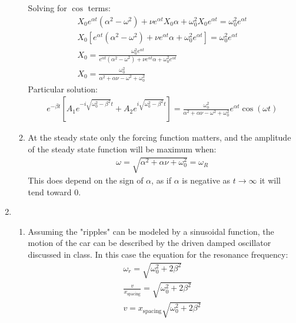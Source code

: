 \documentclass[12pt]{article}
\begin{document}
\begin{enumerate}
\begin{enumerate}
            Solving for $\cos$ terms:
            \begin{gather*}
                X_0 e^{\alpha t}\left(\alpha^2-\omega^2\right)+\nu e^{\alpha t}X_0\alpha+\omega_0^2 X_0 e^{\alpha t}=\omega_0^2 e^{\alpha t}\\
                X_0\left[e^{\alpha t}\left(\alpha^2-\omega^2\right)+\nu e^{\alpha t}\alpha+\omega_0^2 e^{\alpha t}\right]=\omega_0^2 e^{\alpha t}\\
                X_0=\frac{\omega_0^2 e^{\alpha t}}{e^{\alpha t}\left(\alpha^2-\omega^2\right)+\nu e^{\alpha t}\alpha+\omega_0^2 e^{\alpha t}}\\
                X_0=\frac{\omega_0^2}{\alpha^2+\alpha\nu-\omega^2+\omega_0^2}
            \end{gather*}
            Particular solution:
            \begin{gather*}
                e^{-\beta t}\left[A_1 e^{-i\sqrt{\omega_0^2-\beta^2}t}+A_2 e^{i\sqrt{\omega_0^2-\beta^2}t}\right]=\frac{\omega_0^2}{\alpha^2+\alpha\nu-\omega^2+\omega_0^2}e^{\alpha t}\cos(\omega t)
            \end{gather*}
            \item
            At the steady state only the forcing function matters, and the amplitude of the steady state function will be maximum when:
            \begin{gather*}
                \omega=\sqrt{\alpha^2+\alpha\nu+\omega_0^2}=\omega_R
            \end{gather*}
            This does depend on the sign of $\alpha$, as if $\alpha$ is negative as $t\rightarrow\infty$ it will tend toward 0.
        \end{enumerate}
        \item
        \begin{enumerate}
            \item
            Assuming the "ripples" can be modeled by a sinusoidal function, the motion of the car can be described by the driven damped oscillator discussed in class.
            In this case the equation for the resonance frequency:
            \begin{gather*}
                \omega_r=\sqrt{\omega_0^2+2\beta^2}\\
                \frac{v}{x_\text{spacing}}=\sqrt{\omega_0^2+2\beta^2}\\
                v=x_\text{spacing}\sqrt{\omega_0^2+2\beta^2}\\
            \end{gather*}

\end{enumerate}
\end{enumerate}
\end{document}
